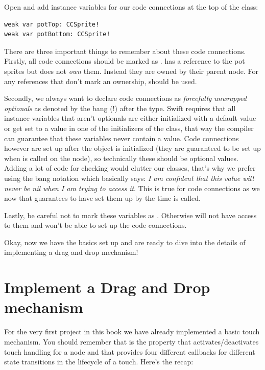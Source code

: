 \begin{leftbar}
Open  and add instance variables for our code
connections at the top of the class:
\begin{lstlisting}
weak var potTop: CCSprite!
weak var potBottom: CCSprite!
\end{lstlisting}
\end{leftbar}
There are three important things to remember about these code connections.
Firstly, all code connections should be marked as .
 has a reference to the pot sprites but does not
\textit{own} them. Instead they are owned by their parent node. For any
references that don't mark an ownership,  should be used. 

Secondly, we always want to declare code connections as \textit{forcefully
unwrapped optionals} as denoted by the bang (!) after the type. Swift
requires that all instance variables that aren't optionals are either
initialized with a default value or get set to a value in one of the
initializers of the class, that way the compiler can guarantee that these
variables never contain a  value. Code connections however are
set up after the object is initialized (they are guaranteed to be set up
when  is called on the node), so technically these
should be optional values. Adding a lot of code for  checking
would clutter our classes, that's why we prefer using the bang notation which
basically says: \textit{I am confident that this value will never be nil when I
am trying to access it}. This is true for code connections as we now that
\cocos{} guarantees to have set them up by the time 
is called.

Lastly, be careful not to mark these variables as .
Otherwise \cocos{} will not have access to them and won't be able to set up the
code connections.

Okay, now we have the basics set up and are ready to dive into the details of
implementing a drag and drop mechanism!

\section{Implement a Drag and Drop mechanism}
For the very first project in this book we have already implemented a basic
touch mechanism. You should remember that  is
the property that activates/deactivates touch handling for a node and that
\cocos{} provides four different callbacks for different state transitions in
the lifecycle of a touch. Here's the recap:

